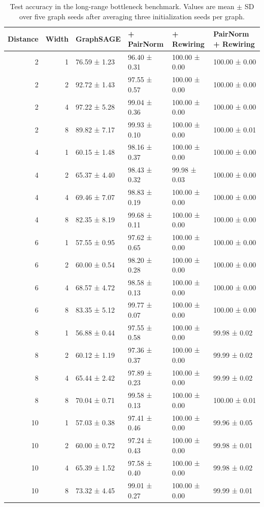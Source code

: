 \begin{table}[htbp]
\caption{Test accuracy in the long-range bottleneck benchmark. Values are mean $\pm$ SD over five graph seeds after averaging three initialization seeds per graph.}
\label{tab:longrange_accuracy}
\begin{tabular}{rrllll}
\toprule
Distance & Width & GraphSAGE & + PairNorm & + Rewiring & PairNorm + Rewiring \\
\midrule
2 & 1 & 76.59 ± 1.23 & 96.40 ± 0.31 & 100.00 ± 0.00 & 100.00 ± 0.00 \\
2 & 2 & 92.72 ± 1.43 & 97.55 ± 0.57 & 100.00 ± 0.00 & 100.00 ± 0.00 \\
2 & 4 & 97.22 ± 5.28 & 99.04 ± 0.36 & 100.00 ± 0.00 & 100.00 ± 0.00 \\
2 & 8 & 89.82 ± 7.17 & 99.93 ± 0.10 & 100.00 ± 0.00 & 100.00 ± 0.01 \\
4 & 1 & 60.15 ± 1.48 & 98.16 ± 0.37 & 100.00 ± 0.00 & 100.00 ± 0.00 \\
4 & 2 & 65.37 ± 4.40 & 98.43 ± 0.32 & 99.98 ± 0.03 & 100.00 ± 0.00 \\
4 & 4 & 69.46 ± 7.07 & 98.83 ± 0.19 & 100.00 ± 0.00 & 100.00 ± 0.00 \\
4 & 8 & 82.35 ± 8.19 & 99.68 ± 0.11 & 100.00 ± 0.00 & 100.00 ± 0.00 \\
6 & 1 & 57.55 ± 0.95 & 97.62 ± 0.65 & 100.00 ± 0.00 & 100.00 ± 0.00 \\
6 & 2 & 60.00 ± 0.54 & 98.20 ± 0.28 & 100.00 ± 0.00 & 100.00 ± 0.00 \\
6 & 4 & 68.57 ± 4.72 & 98.58 ± 0.13 & 100.00 ± 0.00 & 100.00 ± 0.00 \\
6 & 8 & 83.35 ± 5.12 & 99.77 ± 0.07 & 100.00 ± 0.00 & 100.00 ± 0.00 \\
8 & 1 & 56.88 ± 0.44 & 97.55 ± 0.58 & 100.00 ± 0.00 & 99.98 ± 0.02 \\
8 & 2 & 60.12 ± 1.19 & 97.36 ± 0.37 & 100.00 ± 0.00 & 99.99 ± 0.02 \\
8 & 4 & 65.44 ± 2.42 & 97.89 ± 0.23 & 100.00 ± 0.00 & 99.99 ± 0.02 \\
8 & 8 & 70.04 ± 0.71 & 99.58 ± 0.13 & 100.00 ± 0.00 & 100.00 ± 0.01 \\
10 & 1 & 57.03 ± 0.38 & 97.41 ± 0.46 & 100.00 ± 0.00 & 99.96 ± 0.05 \\
10 & 2 & 60.00 ± 0.72 & 97.24 ± 0.43 & 100.00 ± 0.00 & 99.98 ± 0.01 \\
10 & 4 & 65.39 ± 1.52 & 97.58 ± 0.40 & 100.00 ± 0.00 & 99.98 ± 0.02 \\
10 & 8 & 73.32 ± 4.45 & 99.01 ± 0.27 & 100.00 ± 0.00 & 99.99 ± 0.01 \\
\bottomrule
\end{tabular}
\end{table}
